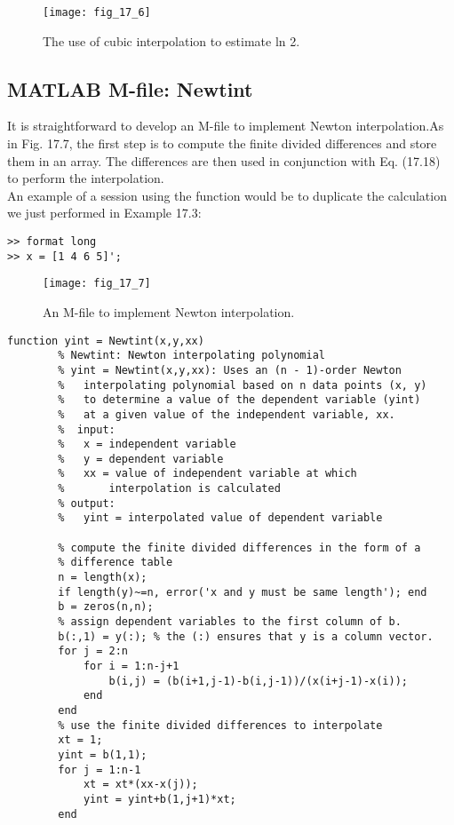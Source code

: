 \documentclass[../main.tex]{subfiles}
\begin{document}
    \begin{figure}[H]
        \centering
        \texttt{[image: fig\_17\_6]}
       \caption{\textsf{The use of cubic interpolation to estimate ln 2.}}\label{fig:fig_17_6}
    \end{figure}

    \subsection{MATLAB M-file: Newtint}
    It is straightforward to develop an M-file to implement Newton interpolation.As in Fig. 17.7,
    the first step is to compute the finite divided differences and store them in an array. The differences are then used in conjunction with Eq. (17.18) to perform the interpolation.\\
    An example of a session using the function would be to duplicate the calculation we
    just performed in Example 17.3:
    
    \begin{lstlisting}[numbers=none]
>> format long
>> x = [1 4 6 5]';
    \end{lstlisting}
    
    \begin{figure}[H]
        \centering
        \texttt{[image: fig\_17\_7]}
       \caption{\textsf{An M-file to implement Newton interpolation.}}\label{fig:fig_17_7}
    \end{figure}

    \begin{lstlisting}[numbers=none]
        function yint = Newtint(x,y,xx)
        % Newtint: Newton interpolating polynomial
        % yint = Newtint(x,y,xx): Uses an (n - 1)-order Newton
        %   interpolating polynomial based on n data points (x, y)
        %   to determine a value of the dependent variable (yint)
        %   at a given value of the independent variable, xx.
        %  input:
        %   x = independent variable
        %   y = dependent variable
        %   xx = value of independent variable at which
        %       interpolation is calculated
        % output:
        %   yint = interpolated value of dependent variable

        % compute the finite divided differences in the form of a
        % difference table
        n = length(x);
        if length(y)~=n, error('x and y must be same length'); end
        b = zeros(n,n);
        % assign dependent variables to the first column of b.
        b(:,1) = y(:); % the (:) ensures that y is a column vector.
        for j = 2:n
            for i = 1:n-j+1
                b(i,j) = (b(i+1,j-1)-b(i,j-1))/(x(i+j-1)-x(i));
            end
        end
        % use the finite divided differences to interpolate
        xt = 1;
        yint = b(1,1);
        for j = 1:n-1
            xt = xt*(xx-x(j));
            yint = yint+b(1,j+1)*xt;
        end
    \end{lstlisting}
\end{document}
